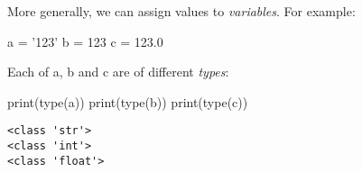 \documentclass[a4paper,]{scrartcl}
\newenvironment{Shaded}{}{}
\newcommand{\DecValTok}[1]{\textcolor[rgb]{0.25,0.63,0.44}{#1}}
\newcommand{\FloatTok}[1]{\textcolor[rgb]{0.25,0.63,0.44}{#1}}
\newcommand{\StringTok}[1]{\textcolor[rgb]{0.25,0.44,0.63}{#1}}
\newcommand{\OperatorTok}[1]{\textcolor[rgb]{0.40,0.40,0.40}{#1}}
\newcommand{\BuiltInTok}[1]{#1}
\newcommand{\NormalTok}[1]{#1}
\begin{document}
More generally, we can assign values to \emph{variables}. For example:

\begin{Shaded}
\begin{Highlighting}[]
\NormalTok{a }\OperatorTok{=} \StringTok{'123'}
\NormalTok{b }\OperatorTok{=} \DecValTok{123}
\NormalTok{c }\OperatorTok{=} \FloatTok{123.0}
\end{Highlighting}
\end{Shaded}

Each of a, b and c are of different \emph{types}:

\begin{Shaded}
\begin{Highlighting}[]
\BuiltInTok{print}\NormalTok{(}\BuiltInTok{type}\NormalTok{(a))}
\BuiltInTok{print}\NormalTok{(}\BuiltInTok{type}\NormalTok{(b))}
\BuiltInTok{print}\NormalTok{(}\BuiltInTok{type}\NormalTok{(c))}
\end{Highlighting}
\end{Shaded}

\begin{verbatim}
<class 'str'>
<class 'int'>
<class 'float'>
\end{verbatim}
\end{document}
